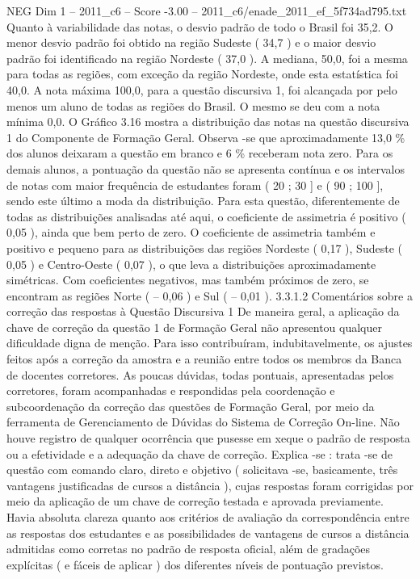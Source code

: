 \begin{textsample}{NEG Dim 1 – 2011\_c6 – Score -3.00 – 2011\_c6/enade\_2011\_ef\_5f734ad795.txt}
Quanto à variabilidade das notas, o desvio padrão de todo o Brasil foi 35,2.
O menor desvio padrão foi obtido na região Sudeste ( 34,7 ) e o maior desvio padrão foi identificado na região Nordeste ( 37,0 ).
A mediana, 50,0, foi a mesma para todas as regiões, com exceção da região Nordeste, onde esta estatística foi 40,0.
A nota máxima 100,0, para a questão discursiva 1, foi alcançada por pelo menos um aluno de todas as regiões do Brasil.
O mesmo se deu com a nota mínima 0,0.
O Gráfico 3.16 mostra a distribuição das notas na questão discursiva 1 do Componente de Formação Geral.
Observa -se que aproximadamente 13,0 \% dos alunos deixaram a questão em branco e 6 \% receberam nota zero.
Para os demais alunos, a pontuação da questão não se apresenta contínua e os intervalos de notas com maior frequência de estudantes foram ( 20 ; 30 ] e ( 90 ; 100 ], sendo este último a moda da distribuição.
Para esta questão, diferentemente de todas as distribuições analisadas até aqui, o coeficiente de assimetria é positivo ( 0,05 ), ainda que bem perto de zero.
O coeficiente de assimetria também e positivo e pequeno para as distribuições das regiões Nordeste ( 0,17 ), Sudeste ( 0,05 ) e Centro-Oeste ( 0,07 ), o que leva a distribuições aproximadamente simétricas.
Com coeficientes negativos, mas também próximos de zero, se encontram as regiões Norte ( – 0,06 ) e Sul ( – 0,01 ). 3.3.1.2 Comentários sobre a correção das respostas à Questão Discursiva 1 De maneira geral, a aplicação da chave de correção da questão 1 de Formação Geral não apresentou qualquer dificuldade digna de menção.
Para isso contribuíram, indubitavelmente, os ajustes feitos após a correção da amostra e a reunião entre todos os membros da Banca de docentes corretores.
As poucas dúvidas, todas pontuais, apresentadas pelos corretores, foram acompanhadas e respondidas pela coordenação e subcoordenação da correção das questões de Formação Geral, por meio da ferramenta de Gerenciamento de Dúvidas do Sistema de Correção On-line.
Não houve registro de qualquer ocorrência que pusesse em xeque o padrão de resposta ou a efetividade e a adequação da chave de correção.
Explica -se : trata -se de questão com comando claro, direto e objetivo ( solicitava -se, basicamente, três vantagens justificadas de cursos a distância ), cujas respostas foram corrigidas por meio da aplicação de um chave de correção testada e aprovada previamente.
Havia absoluta clareza quanto aos critérios de avaliação da correspondência entre as respostas dos estudantes e as possibilidades de vantagens de cursos a distância admitidas como corretas no padrão de resposta oficial, além de gradações explícitas ( e fáceis de aplicar ) dos diferentes níveis de pontuação previstos.

\end{textsample}
